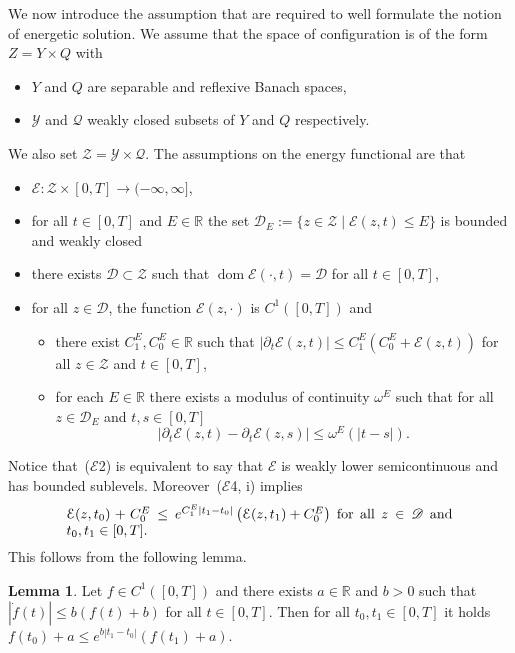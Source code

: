 \documentclass[a4paper,10pt,oneside]{amsbook}
\numberwithin{section}{chapter}
\numberwithin{equation}{chapter}
\theoremstyle{definition}
\newtheorem{lemma}[prop]{Lemma}
\DeclareMathOperator{\dom}{dom}
\begin{document}
We now introduce the assumption that are required to well formulate the notion of energetic solution. We assume that the space of configuration is of the form $Z=Y\times Q$ with
\begin{itemize}[itemsep=0.5em]
\item[(Z1)] $Y$ and $Q$ are separable and reflexive Banach spaces,
\item[(Z2)] $\mathscr{Y}$ and $\mathscr{Q}$ weakly closed subsets of $Y$ and $Q$ respectively.
\end{itemize}
We also set $\mathscr{Z}=\mathscr{Y}\times\mathscr{Q}$. The assumptions on the energy functional are that
\begin{itemize}[itemsep=0.5em]
\item[($\mathcal{E}$1)] $\mathcal{E}\colon\mathscr{Z}\times[0,T]\to(-\infty,\infty]$,
\item[($\mathcal{E}$2)] for all $t\in[0,T]$ and $E\in\mathbb{R}$ the set $\mathscr{D}_E:=\{z\in\mathscr{Z}\;|\;\mathcal{E}(z,t)\le E\}$ is bounded and weakly closed
\item[($\mathcal{E}$3)] there exists $\mathscr{D}\subset\mathscr{Z}$ such that $\dom\mathcal{E}(\cdot,t)=\mathscr{D}$ for all $t\in[0,T]$,
\item[($\mathcal{E}$4)] for all $z\in\mathscr{D}$, the function $\mathcal{E}(z,\cdot)$ is $C^1([0,T])$ and
\begin{itemize}
\item[(i)] there exist $C_1^E,C_0^E\in\mathbb{R}$ such that $|\partial_t\mathcal{E}(z,t)|\le C_1^E(C_0^E+\mathcal{E}(z,t))$ for all $z\in\mathscr{Z}$ and $t\in[0,T]$,
\item[(ii)] for each $E\in\mathbb{R}$ there exists a modulus of continuity $\omega^E$ such that for all $z\in\mathscr{D}_E$ and $t,s\in[0,T]$
\[
|\partial_t\mathcal{E}(z,t)-\partial_t\mathcal{E}(z,s)|\le\omega^E(|t-s|).
\]
\end{itemize}
\end{itemize}
Notice that~($\mathcal{E}$2) is equivalent to say that $\mathcal{E}$ is weakly lower semicontinuous and has bounded sublevels. Moreover~($\mathcal{E}$4, i) implies
\begin{equation}
\label{eqn:ES-gronwall}
\parbox[c]{0.8\textwidth}{$\mathcal{E}(z,t_0)+C_0^E\le e^{C_1^E|t_1-t_0|}\left(\mathcal{E}(z,t_1)+C_0^E\right)$ for all $z\in\mathscr{D}$ and $t_0,t_1\in[0,T]$.}
\end{equation}
This follows from the following lemma.
\begin{lemma}
Let $f\in C^1([0,T])$ and there exists $a\in\mathbb{R}$ and $b>0$ such that
$|\dot{f}(t)|\le b(f(t)+b)$ for all $t\in[0,T]$. Then for all $t_0,t_1\in[0,T]$ it holds $f(t_0)+a\le e^{b|t_1-t_0|}(f(t_1)+a)$.
\end{lemma}
\end{document}
